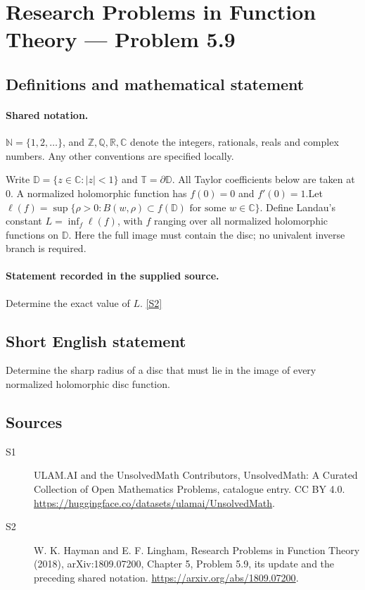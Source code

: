 \documentclass[11pt]{article}
\newcommand{\sref}[2]{\hyperlink{source:#1:#2}{[S#2]}}
\begin{document}
\section{Research Problems in Function Theory — Problem 5.9}\label{statement}

\subsection{Definitions and mathematical statement}

\paragraph{Shared notation.}$\mathbb N=\{1,2,\ldots\}$, and $\mathbb Z,\mathbb Q,\mathbb R,\mathbb C$ denote the integers, rationals, reals and complex numbers. Any other conventions are specified locally.


Write $\mathbb D=\{z\in\mathbb C:|z|<1\}$ and $\mathbb T=\partial\mathbb D$. All Taylor coefficients below are taken at $0$. A normalized holomorphic function has $f(0)=0$ and $f'(0)=1$.Let $\ell(f)=\sup\{\rho>0:B(w,\rho)\subset f(\mathbb D)\text{ for some }w\in\mathbb C\}$. Define Landau's constant $L=\inf_f\ell(f)$, with $f$ ranging over all normalized holomorphic functions on $\mathbb D$. Here the full image must contain the disc; no univalent inverse branch is required.
\paragraph{Statement recorded in the supplied source.}
Determine the exact value of $L$. \sref{statement}{2}
\subsection{Short English statement}
Determine the sharp radius of a disc that must lie in the image of every normalized holomorphic disc function.
\subsection{Sources}
\begin{description}
\item[\hypertarget{source:statement:1}{S1}] ULAM.AI and the UnsolvedMath Contributors, UnsolvedMath: A Curated Collection of Open Mathematics Problems, catalogue entry. CC BY 4.0. \url{https://huggingface.co/datasets/ulamai/UnsolvedMath}.
\item[\hypertarget{source:statement:2}{S2}] W. K. Hayman and E. F. Lingham, Research Problems in Function Theory (2018), arXiv:1809.07200, Chapter 5, Problem 5.9, its update and the preceding shared notation. \url{https://arxiv.org/abs/1809.07200}.
\end{description}
\label{end:statement}
\end{document}

